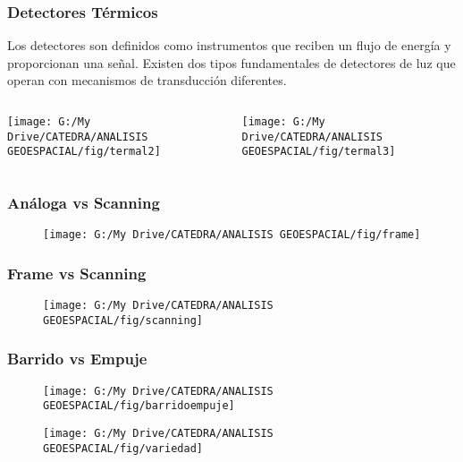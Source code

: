 \documentclass[14pt]{beamer}
\begin{document}
\begin{frame}
\frametitle{Detectores Térmicos}
\scriptsize{
Los detectores son definidos como instrumentos que reciben un flujo de energía y proporcionan una señal. Existen dos tipos fundamentales de detectores de luz que operan con mecanismos de transducción diferentes.
}
  \begin{columns}
		\begin{column}{.5\linewidth}
		 \texttt{[image: G:/My Drive/CATEDRA/ANALISIS GEOESPACIAL/fig/termal2]}
		\end{column}
		\begin{column}{.5\linewidth}
\texttt{[image: G:/My Drive/CATEDRA/ANALISIS GEOESPACIAL/fig/termal3]}
		\end{column}
	\end{columns}
\end{frame}
\begin{frame}
\frametitle{Análoga vs Scanning} 
 \begin{figure}
    \centering
    \texttt{[image: G:/My Drive/CATEDRA/ANALISIS GEOESPACIAL/fig/frame]}
  \end{figure}
\end{frame}
\begin{frame}
\frametitle{Frame vs Scanning} 
 \begin{figure}
    \centering
    \texttt{[image: G:/My Drive/CATEDRA/ANALISIS GEOESPACIAL/fig/scanning]}
  \end{figure}
\end{frame}
\begin{frame}
\frametitle{Barrido vs Empuje} 
 \begin{figure}
    \centering
    \texttt{[image: G:/My Drive/CATEDRA/ANALISIS GEOESPACIAL/fig/barridoempuje]}
  \end{figure}
\end{frame}
\begin{frame}
 \begin{figure}
    \centering
    \texttt{[image: G:/My Drive/CATEDRA/ANALISIS GEOESPACIAL/fig/variedad]}
  \end{figure}
\end{frame}
\end{document}
